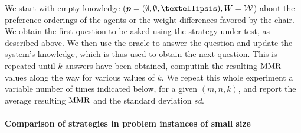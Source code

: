 \documentclass[sigconf, anonymous]{aamas}
\begin{document}
We start with empty knowledge ($\pprofile = (\emptyset, \emptyset, …), W = \W$) about the preference orderings of the agents or the weight differences favored by the chair. We obtain the first question to be asked using the strategy under test, as described above. We then use the oracle to answer the question and update the system's knowledge, which is thus used to obtain the next question. This is repeated until $k$ answers have been obtained, computinh the resulting $\operatorname{MMR}$ values along the way for various values of $k$. We repeat this whole experiment a variable number of times indicated below, for a given $(m, n, k)$, and report the average resulting $\operatorname{MMR}$ and the standard deviation \textit{sd}.

\paragraph{Comparison of strategies in problem instances of small size}
\end{document}
